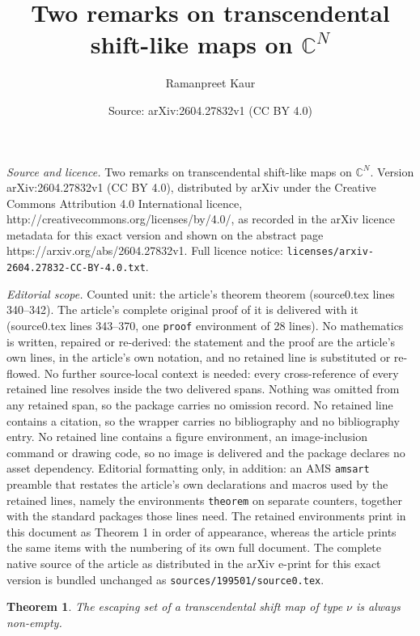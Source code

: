 \documentclass[10pt,a4paper]{amsart}
\title{Two remarks on transcendental shift-like maps on $\mathbb{C}^N$}
\author{Ramanpreet Kaur}
\date{Source: arXiv:2604.27832v1 (CC BY 4.0)}
\newtheorem{theorem}{Theorem}
\begin{document}
\maketitle

\noindent\emph{Source and licence.} Two remarks on transcendental shift-like maps on $\mathbb{C}^N$. Version arXiv:2604.27832v1 (CC BY 4.0), distributed by arXiv under the Creative Commons Attribution 4.0 International licence, http://creativecommons.org/licenses/by/4.0/, as recorded in the arXiv licence metadata for this exact version and shown on the abstract page https://arxiv.org/abs/2604.27832v1. Full licence notice: \texttt{licenses/arxiv-2604.27832-CC-BY-4.0.txt}.\par\smallskip

\noindent\textit{Editorial scope.} Counted unit: the article's theorem theorem (source0.tex lines 340--342). The article's complete original proof of it is delivered with it (source0.tex lines 343--370, one \texttt{proof} environment of 28 lines). No mathematics is written, repaired or re-derived: the statement and the proof are the article's own lines, in the article's own notation, and no retained line is substituted or re-flowed.  No further source-local context is needed: every cross-reference of every retained line resolves inside the two delivered spans.  Nothing was omitted from any retained span, so the package carries no omission record.  No retained line contains a citation, so the wrapper carries no bibliography and no bibliography entry.  No retained line contains a figure environment, an image-inclusion command or drawing code, so no image is delivered and the package declares no asset dependency.  Editorial formatting only, in addition: an AMS \texttt{amsart} preamble that restates the article's own declarations and macros used by the retained lines, namely the environments \texttt{theorem} on separate counters, together with the standard packages those lines need.  The retained environments print in this document as Theorem 1 in order of appearance, whereas the article prints the same items with the numbering of its own full document.  The complete native source of the article as distributed in the arXiv e-print for this exact version is bundled unchanged as \texttt{sources/199501/source0.tex}.
\begin{theorem}
The escaping set of a transcendental shift map of type $\nu$ is always non-empty.
\end{theorem}
\end{document}
